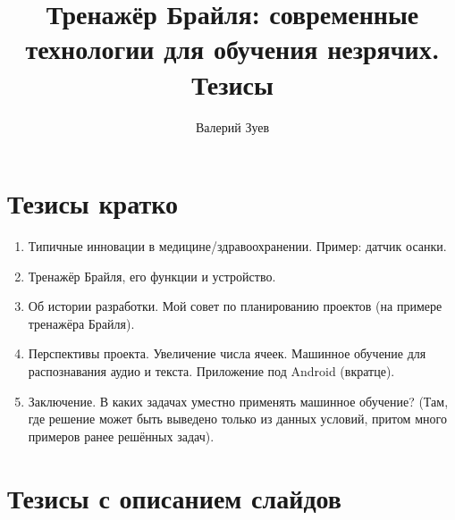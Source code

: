 \documentclass[a4paper,12pt]{article} %
\begin{document}
	
\title{Тренажёр Брайля: современные технологии для обучения незрячих. Тезисы}
\author{Валерий Зуев}

\maketitle

\section {Тезисы кратко}

\begin{enumerate}
	
	\item{} Типичные инновации в медицине/здравоохранении. Пример: датчик осанки.
	\item{} Тренажёр Брайля, его функции и устройство.
	\item{} Об истории разработки. Мой совет по планированию проектов (на примере тренажёра Брайля).
	\item{} Перспективы проекта. Увеличение числа ячеек. Машинное обучение для распознавания аудио и текста. Приложение под Android (вкратце).
	\item{} Заключение. В каких задачах уместно применять машинное обучение? (Там, где решение может быть выведено только из данных условий, притом много примеров ранее решённых задач).

\end{enumerate}

\section {Тезисы с описанием слайдов}
\end{document}
